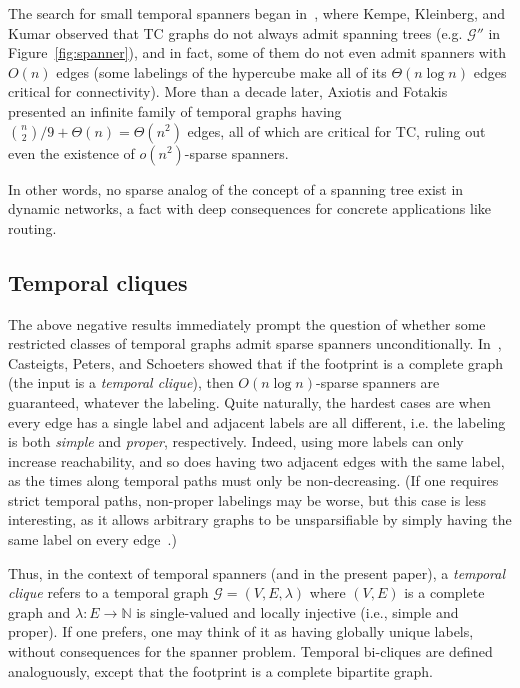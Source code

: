 \documentclass[USenglish, a4paper, thm-restate,numberwithinsect, cleveref]{lipics-v2021}
\newcommand{\G}{\ensuremath{\mathcal{G}}\xspace}
\begin{document}
The search for small temporal spanners began in~\cite{KKK00}, where Kempe, Kleinberg, and Kumar observed that \textsf{TC} graphs do not always admit spanning trees (e.g. $\G''$ in Figure~\ref{fig:spanner}), and in fact, some of them do not even admit spanners with $O(n)$ edges (some labelings of the hypercube make all of its $\Theta(n \log n)$ edges critical for connectivity).
More than a decade later, Axiotis and Fotakis~\cite{AF16} presented an infinite family of temporal graphs having ${n \choose 2}/9+\Theta(n)=\Theta(n^2)$ edges, all of which are critical for \textsf{TC}, ruling out even the existence of $o(n^2)$-sparse spanners.

In other words, no sparse analog of the concept of a spanning tree exist in dynamic networks, a fact with deep consequences for concrete applications like routing.

\subsection{Temporal cliques}

The above negative results immediately prompt the question of whether some restricted classes of temporal graphs admit sparse spanners unconditionally. In~\cite{CPS19}, Casteigts, Peters, and Schoeters showed that if the footprint is a complete graph (the input is a \emph{temporal clique}), then $O(n \log n)$-sparse spanners are guaranteed, whatever the labeling. Quite naturally, the hardest cases are when every edge has a single label and adjacent labels are all different, i.e. the labeling is both \emph{simple} and \emph{proper}, respectively. Indeed, using more labels can only increase reachability, and so does having two adjacent edges with the same label, as the times along temporal paths must only be non-decreasing. (If one requires strict temporal paths, non-proper labelings may be worse, but this case is less interesting, as it allows arbitrary graphs to be unsparsifiable by simply having the same label on every edge~\cite{AGMS17,KKK00}.)

Thus, in the context of temporal spanners (and in the present paper), a \emph{temporal clique} refers to a temporal graph $\G=(V,E,\lambda)$ where $(V,E)$ is a complete graph and $\lambda: E \to \mathbb{N}$ is single-valued and locally injective (i.e., simple and proper). If one prefers, one may think of it as having globally unique labels, without consequences for the spanner problem. Temporal bi-cliques are defined analoguously, except that the footprint is a complete bipartite graph.
\end{document}
